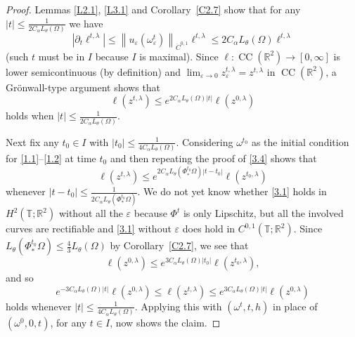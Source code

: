 \documentclass[reqno,centertags,12pt]{amsart}
\theoremstyle{definition}
\numberwithin{equation}{section}
\newcommand{\abs}[1]{\left\lvert#1\right\rvert}
\newcommand{\norm}[1]{\left\|#1\right\|}
\newcommand{\bbR}{{\mathbb{R}}}
\newcommand{\bbT}{{\mathbb{T}}}
\newcommand{\eps}{\varepsilon}
\newcommand{\tht}{\theta}
\begin{document}
\begin{proof}
    Lemmas \ref{L2.1}, \ref{L3.1} and Corollary~\ref{C2.7} show that for any  $\abs{t}\leq\frac{1}{2C_{\alpha}L_{\tht}(\Omega)}$ we have 
    \begin{equation}\label{3.3}
        \abs{\partial_{t}\ell^{t,\lambda}}
        \leq \norm{u_{\eps}(\omega_{\eps}^{t})}_{\dot{C}^{0,1}}
        \ell^{t,\lambda}
        \leq 2C_{\alpha}L_{\tht}(\Omega)\ell^{t,\lambda}
    \end{equation}
    (such $t$ must be in $I$ because $I$ is maximal).
    Since $\ell\colon\operatorname{CC}(\bbR^{2})\to[0,\infty]$ is lower semicontinuous
    (by definition) and $\lim_{\eps\to 0} z_\eps^{t,\lambda}= z^{t,\lambda}$ in $\operatorname{CC}(\bbR^{2})$, a Gr\"{o}nwall-type argument shows that
    \begin{equation}\label{3.4}
        \ell(z^{t,\lambda}) \leq e^{2C_{\alpha}L_{\tht}(\Omega)\abs{t}}\ell(z^{0,\lambda})
    \end{equation}
    holds when $\abs{t}\leq\frac{1}{2C_{\alpha}L_{\tht}(\Omega)}$.

    Next fix any $t_{0}\in I$ with $\abs{t_{0}}\leq\frac{1}{4C_{\alpha}L_{\tht}(\Omega)}$.
    Considering $\omega^{t_{0}}$ as the initial condition for \eqref{1.1}--\eqref{1.2}
    at time $ t_{0}$ and then repeating the proof of \eqref{3.4} shows that 
\[
        \ell(z^{t,\lambda}) \leq e^{2C_{\alpha}L_\tht(\Phi_{*}^{t_{0}}\Omega)\abs{t - t_{0}}}\ell(z^{t_0,\lambda})
\]
    whenever $\abs{t - t_{0}}\leq\frac{1}{2C_{\alpha}L_{\tht}(\Phi_{*}^{t_{0}}\Omega)}$.
    We do not yet know whether \eqref{3.1} holds in $H^{2}(\bbT;\bbR^{2})$ without all the $\eps$ because $\Phi^{t}$ is only Lipschitz,  but  all the involved curves are rectifiable and
    \eqref{3.1} without $\eps$ does hold in $C^{0,1}(\bbT;\bbR^{2})$.
    Since $L_{\tht}(\Phi_{*}^{t_{0}}\Omega) \leq \frac{4}{3}L_{\tht}(\Omega)$ by Corollary~\ref{C2.7},
    we see that
    \[
        \ell(z^{0,\lambda}) \leq e^{3C_{\alpha}L_{\tht}(\Omega)\abs{t_{0}}}\ell(z^{t_{0},\lambda}),
    \]
and so
    \[
        e^{-3C_{\alpha}L_{\tht}(\Omega)\abs{t}}\ell(z^{0,\lambda})
        \leq \ell(z^{t,\lambda}) \leq
        e^{3C_{\alpha}L_{\tht}(\Omega)\abs{t}}\ell(z^{0,\lambda})
    \]
    holds whenever $\abs{t}\leq\frac{1}{4C_{\alpha}L_{\tht}(\Omega)}$.
    Applying this with $(\omega^t,t,h)$ in place of $(\omega^0,0,t)$,
    for any $t\in I$, now shows the claim.
\end{proof}
\end{document}
